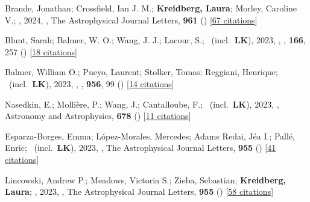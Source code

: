 \item[{\color{numcolor}\scriptsize99}] Brande, Jonathan; Crossfield, Ian J. M.; \textbf{Kreidberg, Laura}; Morley, Caroline V.; \etal, 2024, , The Astrophysical Journal Letters, \textbf{961} () [\href{https://ui.adsabs.harvard.edu/abs/2024ApJ...961L..23B}{67 citations}]

\item[{\color{numcolor}\scriptsize98}] Blunt, Sarah; Balmer, W. O.; Wang, J. J.; Lacour, S.; \etal\ (incl.\ \textbf{LK}), 2023, , \aj, \textbf{166}, 257 () [\href{https://ui.adsabs.harvard.edu/abs/2023AJ....166..257B}{18 citations}]

\item[{\color{numcolor}\scriptsize97}] Balmer, William O.; Pueyo, Laurent; Stolker, Tomas; Reggiani, Henrique; \etal\ (incl.\ \textbf{LK}), 2023, , \apj, \textbf{956}, 99 () [\href{https://ui.adsabs.harvard.edu/abs/2023ApJ...956...99B}{14 citations}]

\item[{\color{numcolor}\scriptsize96}] Nasedkin, E.; Molli{\`e}re, P.; Wang, J.; Cantalloube, F.; \etal\ (incl.\ \textbf{LK}), 2023, , Astronomy and Astrophysics, \textbf{678} () [\href{https://ui.adsabs.harvard.edu/abs/2023A&A...678A..41N}{11 citations}]

\item[{\color{numcolor}\scriptsize95}] Esparza-Borges, Emma; L{\'o}pez-Morales, Mercedes; Adams Redai, J{\'e}a I.; Pall{\'e}, Enric; \etal\ (incl.\ \textbf{LK}), 2023, , The Astrophysical Journal Letters, \textbf{955} () [\href{https://ui.adsabs.harvard.edu/abs/2023ApJ...955L..19E}{41 citations}]

\item[{\color{numcolor}\scriptsize94}] Lincowski, Andrew P.; Meadows, Victoria S.; Zieba, Sebastian; \textbf{Kreidberg, Laura}; \etal, 2023, , The Astrophysical Journal Letters, \textbf{955} () [\href{https://ui.adsabs.harvard.edu/abs/2023ApJ...955L...7L}{58 citations}]

